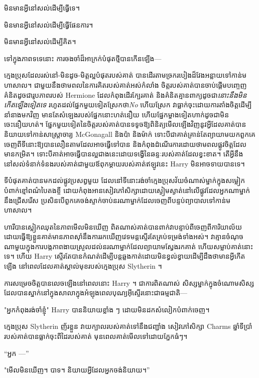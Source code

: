 
 មិនមានអ្វីនៅសល់ដើម្បីធ្វើទេ។

\hplettrineextrapara
មិនមានអ្វីនៅសល់ដើម្បីធ្វើផែនការ។

មិនមានអ្វីនៅសល់ដើម្បីគិត។

ទៅក្នុងភាពទទេនោះ ការចងចាំដ៏អាក្រក់បំផុតថ្មីបានកើនឡើង—

ក្មេងប្រុសដែលរស់នៅ-មិនដូច-មិត្តល្អបំផុតរបស់គាត់ បានដើរតាមច្រករបៀងដ៏វែងអន្លាយទៅកាន់មហាសាល។ ជាមួយនឹងថាមពលនៃការគិតរបស់គាត់អស់កំលាំង ចិត្តរបស់គាត់បានចាប់ផ្តើមបញ្ចេញគំនិតដូចជារូបភាពរបស់ Hermione ដែលកំពុងដើរក្បែរគាត់ និងគំនិតគ្មានពាក្យដូចជា\emph{នោះនឹងមិនកើតឡើងទៀតទេ} រហូតដល់ផ្នែកមួយទៀតស្រែកថា\emph{No} ហើយស្រែក វាធ្លាក់ចុះដោយការតាំងចិត្តដើម្បីនាំនាងមកវិញ មានតែសំឡេងរបស់ផ្នែកនោះហត់នឿយ ហើយផ្នែកម្ខាងទៀតហាក់ដូចជាមិនចេះនឿយហត់។ ផ្នែកមួយទៀតនៃចិត្តរបស់គាត់បានទទូចឱ្យពិនិត្យមើលឡើងវិញនូវអ្វីដែលគាត់បាននិយាយទៅកាន់សាស្រ្តាចារ្យ McGonagall និងប៉ា និងម៉ាក់ ទោះបីជាគាត់គ្រាន់តែព្យាយាមយកពួកគេចេញពីទីនោះឱ្យបានលឿនតាមដែលអាចធ្វើទៅបាន និងកំពុងដំណើរការដោយថាមពលផ្លូវចិត្តដែលមានកម្រិត។ ទោះបីគាត់អាចធ្វើបានល្អជាងនេះដោយទង្វើនៃឆន្ទៈរបស់គាត់ដែលខ្វះខាត។ តើអ្វីនឹងនៅសល់ទំនាក់ទំនងរបស់គាត់ជាមួយឪពុកម្តាយរបស់គាត់ឥឡូវនេះ Harry មិនអាចទាយបានទេ។

ទីបំផុតគាត់បានមកដល់ផ្លូវប្រសព្វមួយ ដែលនៅទីនោះរង់ចាំក្មេងប្រុសវ័យចំណាស់ម្នាក់ក្នុងសម្លៀកបំពាក់ខ្មៅពណ៌បៃតងខ្ចី ដោយកំពុងអានសៀវភៅសិក្សាដោយស្ងៀមស្ងាត់នៅលើផ្លូវដែលអ្នកណាម្នាក់នឹងជ្រើសរើស ប្រសិនបើពួកគេចង់ស្ទាក់ចាប់នរណាម្នាក់ដែលចេញពីបន្ទប់ព្យាបាលទៅកាន់មហាសាល។

ហារីបានស្លៀកឈុតនៃភាពមើលមិនឃើញ ពិតណាស់គាត់បានពាក់វាបន្ទាប់ពីចេញពីការិយាល័យ ដោយធ្វើឱ្យខ្លួនគាត់មានភាពស៊ាំនឹងការរកឃើញវេទមន្តស្ទើរតែគ្រប់ទម្រង់ទាំងអស់។ វាគ្មានចំណុចណាមួយក្នុងការបង្កភាពងាយស្រួលដល់នរណាម្នាក់ដែលព្យាយាមស្វែងរកគាត់ ហើយសម្លាប់គាត់នោះទេ។ ហើយ Harry ស្ទើរតែបានកំណត់ដើម្បីបន្តឆ្លងកាត់ដោយមិនខ្វល់ខ្វាយដើម្បីដឹងថាមានអ្វីកើតឡើង នៅពេលដែលគាត់ស្គាល់មុខរបស់ក្មេងប្រុស Slytherin ។

ការ​សម្រេច​ចិត្ត​បាន​លេច​ឡើង​នៅ​ពេល​នោះ Harry ។ ជា​ការ​ពិត​ណាស់ សិស្ស​ម្នាក់​ក្នុង​ចំណោម​សិស្ស​ដែល​បាន​ស្នាក់​នៅ​ក្នុង​សាលា​ក្នុង​អំឡុង​ពេល​បុណ្យ​អ៊ីស្ទើរ​នោះ​ជា​ធម្មជាតិ—

"អ្នកកំពុងរង់ចាំខ្ញុំ" Harry បាននិយាយខ្លាំង ៗ ដោយមិនដកសំលៀកបំពាក់ចេញ។

ក្មេងប្រុស Slytherin ញ័រខ្លួន វាយក្បាលរបស់គាត់ទៅនឹងជញ្ជាំង សៀវភៅសិក្សា Charms ឆ្នាំទីប្រាំរបស់គាត់បានធ្លាក់ចុះពីដៃរបស់គាត់ មុនពេលគាត់មើលទៅដោយភ្នែកធំៗ។

“អ្នក —”

"មើលមិនឃើញ។ បាទ។ និយាយអ្វីដែលអ្នកចង់និយាយ។”

